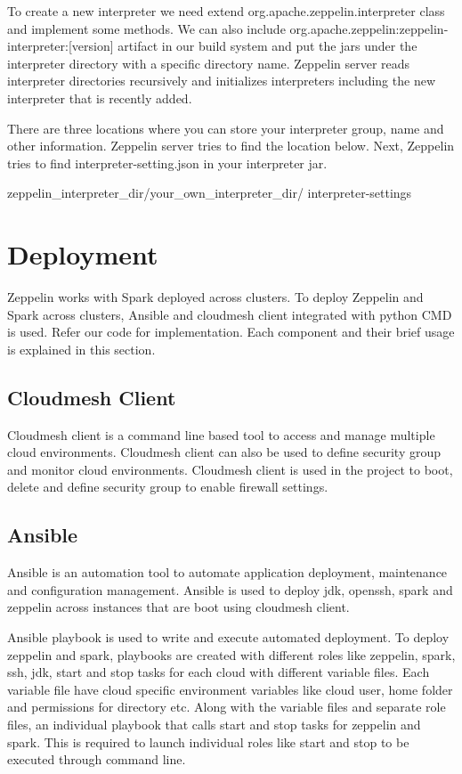 \documentclass[9pt,twocolumn,twoside]{../../styles/osajnl}
\begin{document}
	To create a new interpreter we need extend 
	org.apache.zeppelin.interpreter class and implement some methods. 
	We 
	can also include 
	org.apache.zeppelin:zeppelin-interpreter:[version] 
	artifact in our build system and put the jars under the 
	interpreter 
	directory with a specific directory name. Zeppelin server reads 
	interpreter directories recursively and initializes interpreters 
	including the new interpreter that is recently added.
	
	There are three locations where you can store your interpreter 
	group, 
	name and other information. Zeppelin server tries to find the 
	location below. Next, Zeppelin tries to find 
	interpreter-setting.json 
	in your interpreter jar.
	
	zeppelin\_interpreter\_dir/your\_own\_interpreter\_dir/
	interpreter-settings
	
	\section{Deployment}
	
	Zeppelin works with Spark deployed across clusters. To deploy 
	Zeppelin
	and Spark across clusters, Ansible and cloudmesh client integrated
	with python CMD is used. Refer our code for implementation. Each
	component and their brief usage is explained in this section.
	
	\subsection{Cloudmesh Client}
	
	Cloudmesh client is a command line based tool to access and manage
	multiple cloud environments. Cloudmesh client can also be used to
	define security group and monitor cloud environments. Cloudmesh 
	client
	is used in the project to boot, delete and define security group 
	to
	enable firewall settings.
	
	\subsection{Ansible}
	
	Ansible is an automation tool to automate application deployment,
	maintenance and configuration management. Ansible is used to 
	deploy
	jdk, openssh, spark and zeppelin across instances that are boot 
	using
	cloudmesh client.
	
	Ansible playbook is used to write and execute automated 
	deployment. To
	deploy zeppelin and spark, playbooks are created with different 
	roles
	like zeppelin, spark, ssh, jdk, start and stop tasks for each 
	cloud with different
	variable files. Each variable file have cloud specific environment
	variables like cloud user, home folder and permissions for 
	directory
	etc. Along with the variable files and separate role files, an 
	individual playbook that calls start and stop tasks for zeppelin 
	and spark. 
	This
	is required to launch individual roles like start and stop to be
	executed through command line. 
	
\end{document}
